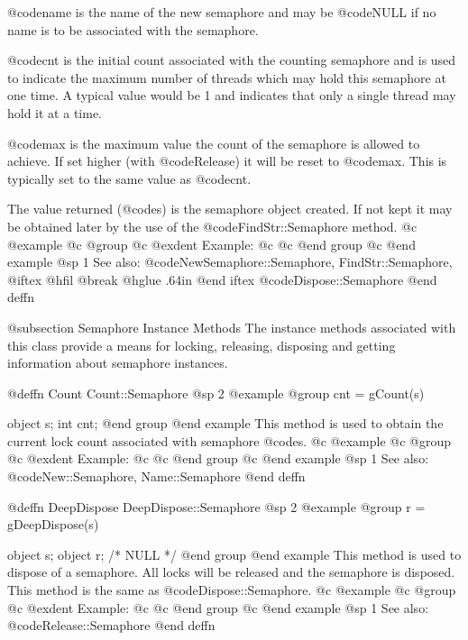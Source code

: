 @code{name} is the name of the new semaphore and may be @code{NULL} if
no name is to be associated with the semaphore.

@code{cnt} is the initial count associated with the counting semaphore
and is used to indicate the maximum number of threads which may hold
this semaphore at one time.  A typical value would be 1 and indicates
that only a single thread may hold it at a time.

@code{max} is the maximum value the count of the semaphore is allowed to
achieve.  If set higher (with @code{Release}) it will be reset to
@code{max}.  This is typically set to the same value as @code{cnt}.

The value returned (@code{s}) is the semaphore object created.  If not
kept it may be obtained later by the use of the @code{FindStr::Semaphore}
method.  
@c @example
@c @group
@c @exdent Example:
@c 
@c @end group
@c @end example
@sp 1
See also:  @code{NewSemaphore::Semaphore, FindStr::Semaphore,}
@iftex
@hfil @break @hglue .64in      
@end iftex
@code{Dispose::Semaphore}
@end deffn





@subsection Semaphore Instance Methods
The instance methods associated with this class provide a means
for locking, releasing, disposing and getting information about
semaphore instances.












@deffn {Count} Count::Semaphore
@sp 2
@example
@group
cnt = gCount(s)

object  s;
int     cnt;
@end group
@end example
This method is used to obtain the current lock count associated with
semaphore @code{s}.
@c @example
@c @group
@c @exdent Example:
@c 
@c @end group
@c @end example
@sp 1
See also:  @code{New::Semaphore, Name::Semaphore}
@end deffn









@deffn {DeepDispose} DeepDispose::Semaphore
@sp 2
@example
@group
r = gDeepDispose(s)

object  s;
object  r;     /*  NULL  */
@end group
@end example
This method is used to dispose of a semaphore.  All locks will be released
and the semaphore is disposed.  This method is the same as
@code{Dispose::Semaphore}.
@c @example
@c @group
@c @exdent Example:
@c 
@c @end group
@c @end example
@sp 1
See also:  @code{Release::Semaphore}
@end deffn












